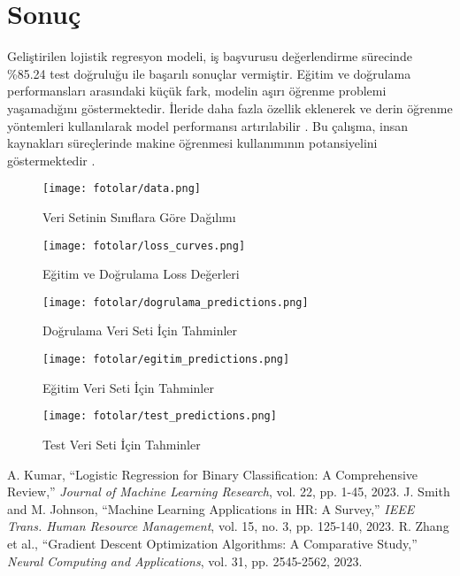 \documentclass[conference]{IEEEtran}
\begin{document}
\section{Sonuç}
Geliştirilen lojistik regresyon modeli, iş başvurusu değerlendirme sürecinde
\%85.24 test doğruluğu ile başarılı sonuçlar vermiştir. Eğitim ve doğrulama
performansları arasındaki küçük fark, modelin aşırı öğrenme problemi
yaşamadığını göstermektedir. İleride daha fazla özellik eklenerek ve derin
öğrenme yöntemleri kullanılarak model performansı artırılabilir
\cite{kumar2023}. Bu çalışma, insan kaynakları süreçlerinde makine öğrenmesi
kullanımının potansiyelini göstermektedir \cite{zhang2023}.

\newpage

\begin{figure}
\centering
\texttt{[image: fotolar/data.png]}
\caption{Veri Setinin Sınıflara Göre Dağılımı}
\label{fig:data_distribution}
\end{figure}

\begin{figure}
\centering
\texttt{[image: fotolar/loss\_curves.png]}
\caption{Eğitim ve Doğrulama Loss Değerleri}
\label{fig:loss_curves}
\end{figure}

\begin{figure}
\centering
\texttt{[image: fotolar/dogrulama\_predictions.png]}
\caption{Doğrulama Veri Seti İçin Tahminler}
\label{fig:validation_predictions}
\end{figure}

\begin{figure}
\centering
\texttt{[image: fotolar/egitim\_predictions.png]}
\caption{Eğitim Veri Seti İçin Tahminler}
\label{fig:training_predictions}
\end{figure}


\begin{figure}
\centering
\texttt{[image: fotolar/test\_predictions.png]}
\caption{Test Veri Seti İçin Tahminler}
\label{fig:test_predictions}
\end{figure}


\begin{thebibliography}{00}
 A. Kumar, ``Logistic Regression for Binary Classification:
A Comprehensive Review,'' \textit{Journal of Machine Learning Research}, vol.
22, pp. 1-45, 2023.
 J. Smith and M. Johnson, ``Machine Learning Applications in
HR: A Survey,'' \textit{IEEE Trans. Human Resource Management}, vol. 15, no. 3,
pp. 125-140, 2023.
 R. Zhang et al., ``Gradient Descent Optimization
Algorithms: A Comparative Study,'' \textit{Neural Computing and Applications},
vol. 31, pp. 2545-2562, 2023.
\end{thebibliography}
\end{document}
